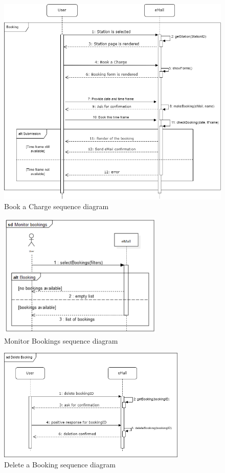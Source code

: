 \documentclass[12pt]{report}
\begin{document}
    \begin{figure}[h]
        \centering
        \includegraphics[width=\textwidth]{assets/UC2.drawio.png}
        \caption{Book a Charge sequence diagram}
    \end{figure}

    \begin{figure}[h]
        \centering
        \includegraphics[width=0.7\textwidth]{assets/monitor_booking.png}
        \caption{Monitor Bookings sequence diagram}
    \end{figure}

    \begin{figure}[h]
        \centering
        \includegraphics[width=0.8\textwidth]{assets/deletebooking.drawio.png}
        \caption{Delete a Booking sequence diagram}
    \end{figure}
\end{document}
